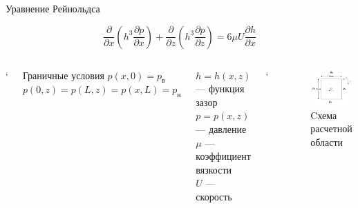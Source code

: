 \documentclass[ignoreonframetext,unicode]{beamer}
\begin{document}
	\begin{frame}{Уравнение Рейнольдса}
		
		\begin{block}{}
			\[
			\frac{\partial}{\partial x} \left(h^3 \frac{\partial p}{\partial x} \right) + \frac{\partial}{\partial z} \left(h^3 \frac{\partial p}{\partial z} \right) = 6 \mu U \frac{\partial h}{\partial x}
			\]
		\end{block}
		
		\begin{columns}
	
		`
			\begin{block}{Граничные условия}
				$p(x, 0) = p_{\text{в}}$\\ 
				$p(0, z) = p(L, z) = p(x, L) = p_{\text{н}}$
			\end{block}
			\begin{block}{}
			$h = h(x, z)$ --- функция зазор \\
			$p = p(x, z)$ --- давление \\
			$\mu$ --- коэффициент вязкости \\
			$U$ --- скорость
			\end{block}

	
	`
	\begin{figure}[!htbp]
	\centering
	\includegraphics[width=\textwidth]{taskGU}%
	\caption{Cхема расчетной области}
	\vspace*{-2mm}
	\label{ser_graph}
\end{figure}

		\end{columns}
		
		
		
	\end{frame}	
\end{document}
